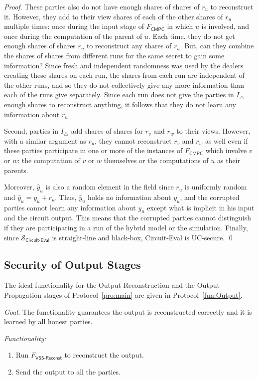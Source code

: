 \documentclass[11pt,letter]{article}
\newcommand{\alg}[1]{\mbox{\textsf{#1}}}
\newcommand{\func}[1]{\mbox{$F_\textsf{#1}$}}
\newcommand{\simu}[1]{\mbox{$\mathcal{S}_\textsf{#1}$}}
\newcommand{\mask}[1]{\widehat{#1}}
\theoremstyle{mytheoremstyle}
\let\savedCaption=\caption
\renewcommand*{\caption}[1]{\savedCaption[#1]{~#1}}
\newcommand{\algfont}{}
\begin{document}
\begin{proof}
	These parties also do not have enough shares of shares of $r_u$ to reconstruct it. However, they add to their view shares of each of the other shares of $r_u$ multiple times: once during the input stage of \func{CMPC} in which $u$ is involved, and once during the computation of the parent of $u$. Each time, they do not get enough shares of shares $r_u$ to reconstruct any shares of $r_u$. But, can they combine the shares of shares from different runs for the same secret to gain some information? Since fresh and independent randomness was used by the dealers creating these shares on each run, the shares from each run are independent of the other runs, and so they do not collectively give any more information than each of the runs give separately. Since each run does not give the parties in $I_\triangle$ enough shares to reconstruct anything, it follows that they do not learn any information about $r_u$.
	
	Second, parties in $I_\triangle$ add shares of shares for $r_v$ and $r_w$ to their views. However, with a similar argument as $r_u$, they cannot reconstruct $r_v$ and $r_w$ as well even if these parties participate in one or more of the instances of \func{CMPC} which involve $v$ or $w$: the computation of $v$ or $w$ themselves or the computations of $u$ as their parents.
	
	Moreover, $\mask{y}_u$ is also a random element in the field since $r_u$ is uniformly random and $\mask{y}_u= y_u + r_u$. Thus, $\mask{y}_u$ holds no information about $y_u$, and the corrupted parties cannot learn any information about $y_u$ except what is implicit in his input and the circuit output. This means that the corrupted parties cannot distinguish if they are participating in a run of the hybrid model or the simulation. Finally, since \simu{Circuit-Eval} is straight-line and black-box, \alg{Circuit-Eval} is UC-secure.
	\qed
\end{proof}

\subsection{Security of Output Stages} \label{sec:proof-output}
The ideal functionality for the Output Reconstruction and the Output Propagation stages of Protocol~\ref{pro:main} are given in Protocol~\ref{fun:Output}.

\begin{algorithm}
	\algfont
	\caption{\func{Output}}
	\label{fun:Output}
	
	\textit{Goal.} The functionality guarantees the output is reconstructed correctly and it is learned by all honest parties.
	\medskip
	
	\textit{Functionality:}
	\begin{enumerate}
		\item Run \func{VSS-Reconst} to reconstruct the output.
		\item Send the output to all the parties.		
	\end{enumerate}
\end{algorithm} 
\end{document}
